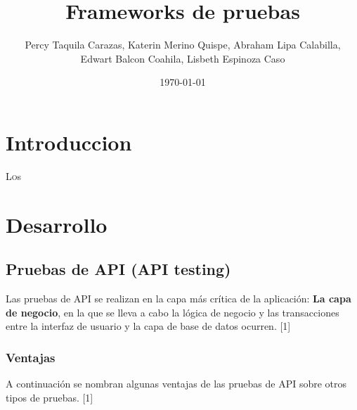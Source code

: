 \documentclass[twoside,twocolumn]{article}
\title{Frameworks de pruebas}
\author{Percy Taquila Carazas, Katerin Merino Quispe, Abraham Lipa Calabilla,
\\Edwart Balcon Coahila, Lisbeth Espinoza Caso}
\date{\today}
\begin{document}
\maketitle


\section{Introduccion}

\lettrine[nindent=0em,lines=3]{L}os





\section{Desarrollo}

\subsection{Pruebas de API (API testing)}

Las pruebas de API se realizan en la capa más crítica de la aplicación: \textbf{La capa de negocio}, en la que se lleva a cabo la lógica de negocio y las transacciones entre la interfaz de usuario y la capa de base de datos ocurren. [1]

\subsubsection{Ventajas}

A continuación se nombran algunas ventajas de las pruebas de API sobre otros tipos de pruebas. [1]
\end{document}
